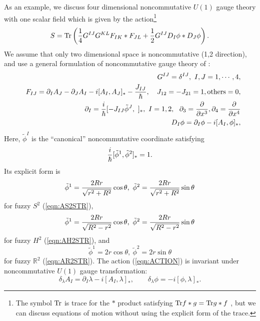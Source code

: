 \documentclass[12pt,a4paper]{article}
\def\h{\hbar}
\begin{document}
As an example, we discuss four dimensional noncommutative $U(1)$ gauge
theory with one scalar field which is given by the action\footnote{
The symbol ${\rm Tr}$ is trace for the $*$ product satisfying ${\rm
  Tr}f*g={\rm Tr}g*f$ \cite{Fedbk}, but we can discuss equations of
motion without using the explicit form of the trace.
}
\begin{equation}
\label{eqn:ACTION}
S={\rm
  Tr}\left({1\over4}G^{IJ}G^{KL}F_{IK}*F_{JL}+{1\over2}G^{IJ}D_I\phi*D_J\phi\right).
\end{equation}
We assume that only two dimensional space is noncommutative (1,2
direction), 
and use a general formulation of noncommutative gauge theory of \cite{AK2}:
\begin{eqnarray}
&&G^{IJ}=\delta^{IJ},\ I,J=1,\cdots,4,\nonumber\\
&&F_{IJ}=\partial_IA_J-\partial_JA_I-i[A_I,A_J]_*-{J_{IJ}\over\h},\quad
J_{12}=-J_{21}=1,{\rm others}=0,\nonumber\\
&&\partial_I={i\over\h}[-J_{IJ}{\tilde \phi}^J,\ ]_*,\ I=1,2,\ \ \partial_3={\partial\over\partial x^3},\partial_4={\partial\over\partial x^4}\nonumber\\
&&D_I\phi=\partial_I\phi-i[A_I,\phi]_*,
\end{eqnarray}
Here,  ${\tilde \phi}^I$ is the ``canonical'' noncommutative coordinate
satisfying
\begin{equation}
\label{eqn:CAN}
{i\over\h}[{\tilde \phi}^1,{\tilde \phi}^2]_*=1.
\end{equation}
Its explicit form is 
\begin{equation}
{\tilde \phi}^1={2Rr\over\sqrt{r^2+R^2}}\cos \theta,\ {\tilde \phi}^2={2Rr\over\sqrt{r^2+R^2}}\sin \theta 
\end{equation}
for fuzzy $S^2$ (\ref{eqn:AS2STR}),
\begin{equation}
{\tilde \phi}^1={2Rr\over\sqrt{R^2-r^2}}\cos \theta,\ {\tilde \phi}^2={2Rr\over\sqrt{R^2-r^2}}\sin \theta 
\end{equation}
for fuzzy $H^2$ (\ref{eqn:AH2STR}), and
\begin{equation}
\label{eqn:PHIR2}
{\tilde \phi}^1=2r\cos \theta,\ {\tilde \phi}^2=2r\sin \theta 
\end{equation}
for fuzzy ${\mathbb R}^2$ (\ref{eqn:AR2STR}).
The action (\ref{eqn:ACTION}) is invariant under noncommutative $U(1)$ 
gauge transformation:
\begin{equation}
\delta_\lambda A_I=\partial_I\lambda-i[A_I,\lambda]_*,\quad\quad
\delta_\lambda\phi=-i[\phi,\lambda]_*.
\end{equation}
\end{document}
